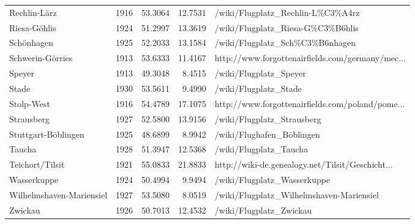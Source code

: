 \begin{table}[h!]
{\begin{tabular}{p{2.8cm}rrrp{6cm}}
  Rechlin-L\"arz & 1916 & 53.3064 & 12.7531 & /wiki/Flugplatz\_Rechlin-L\%C3\%A4rz \\ 
  Riesa-G\"ohlis & 1924 & 51.2997 & 13.3619 & /wiki/Flugplatz\_Riesa-G\%C3\%B6hlis \\ 
  Sch\"onhagen & 1925 & 52.2033 & 13.1584 & /wiki/Flugplatz\_Sch\%C3\%B6nhagen \\ 
  Schwerin-G\"orries & 1913 & 53.6333 & 11.4167 & http://www.forgottenairfields.com/germany/mec... \\ 
   \midrule
Speyer & 1913 & 49.3048 & 8.4515 & /wiki/Flugplatz\_Speyer \\ 
  Stade & 1930 & 53.5611 & 9.4990 & /wiki/Flugplatz\_Stade \\ 
  Stolp-West & 1916 & 54.4789 & 17.1075 & http://www.forgottenairfields.com/poland/pome... \\ 
  Strausberg & 1927 & 52.5800 & 13.9156 & /wiki/Flugplatz\_Strausberg \\ 
  Stuttgart-B\"oblingen & 1925 & 48.6899 & 8.9942 & /wiki/Flughafen\_B\"oblingen \\ 
  Taucha & 1928 & 51.3947 & 12.5368 & /wiki/Flugplatz\_Taucha \\ 
  Teichort/Tilsit & 1921 & 55.0833 & 21.8833 & http://wiki-de.genealogy.net/Tilsit/Geschicht... \\ 
  Wasserkuppe & 1924 & 50.4994 & 9.9494 & /wiki/Flugplatz\_Wasserkuppe \\ 
  Wilhelmshaven-Mariensiel & 1927 & 53.5080 & 8.0519 & /wiki/Flugplatz\_Wilhelmshaven-Mariensiel \\ 
  Zwickau & 1926 & 50.7013 & 12.4532 & /wiki/Flugplatz\_Zwickau \\ 
   \midrule
 \bottomrule
\end{tabular}
}
\end{table}
